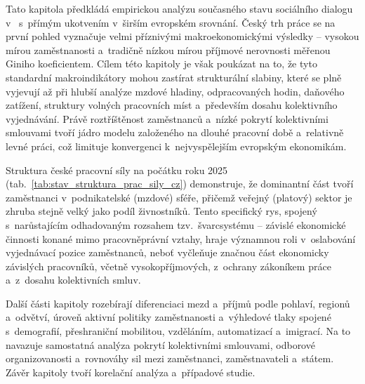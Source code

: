 Tato kapitola předkládá empirickou analýzu současného stavu sociálního dialogu v~ s~přímým ukotvením v~širším evropském srovnání. Český trh práce se na první pohled vyznačuje velmi příznivými makroekonomickými výsledky -- vysokou mírou zaměstnanosti a~tradičně nízkou mírou příjmové nerovnosti měřenou Giniho koeficientem. Cílem této kapitoly je však poukázat na to, že tyto standardní makroindikátory mohou zastírat strukturální slabiny, které se plně vyjevují až při hlubší analýze mzdové hladiny, odpracovaných hodin, daňového zatížení, struktury volných pracovních míst a~především dosahu kolektivního vyjednávání. Právě roztříštěnost zaměstnanců a~nízké pokrytí kolektivními smlouvami tvoří jádro modelu založeného na dlouhé pracovní době a~relativně levné práci, což limituje konvergenci k~nejvyspělejším evropským ekonomikám.\par

Struktura české pracovní síly na počátku roku 2025 (tab.~\ref{tab:stav_struktura_prac_sily_cz}) demonstruje, že dominantní část tvoří zaměstnanci v~podnikatelské (mzdové) sféře, přičemž veřejný (platový) sektor je zhruba stejně velký jako podíl živnostníků. Tento specifický rys, spojený s~narůstajícím odhadovaným rozsahem tzv.~švarcsystému -- závislé ekonomické činnosti konané mimo pracovněprávní vztahy, hraje významnou roli v~oslabování vyjednávací pozice zaměstnanců, neboť vyčleňuje značnou část ekonomicky závislých pracovníků, včetně vysokopříjmových, z~ochrany zákoníkem práce a~z~dosahu kolektivních smluv.\par

Další části kapitoly rozebírají diferenciaci mezd a~příjmů podle pohlaví, regionů a~odvětví, úroveň aktivní politiky zaměstnanosti a~výhledové tlaky spojené s~demografií, přeshraniční mobilitou, vzděláním, automatizací a~imigrací. Na to navazuje samostatná analýza pokrytí kolektivními smlouvami, odborové organizovanosti a~rovnováhy sil mezi zaměstnanci, zaměstnavateli a~státem. Závěr kapitoly tvoří korelační analýza a~případové studie.\par



